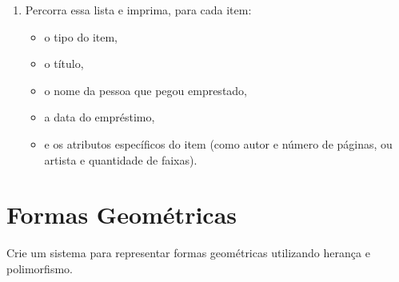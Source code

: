 \documentclass{article}
\begin{document}
\begin{enumerate}
    \item Percorra essa lista e imprima, para cada item:
    \begin{itemize}
        \item o tipo do item,
        \item o título,
        \item o nome da pessoa que pegou emprestado,
        \item a data do empréstimo,
        \item e os atributos específicos do item (como autor e número de páginas, ou artista e quantidade de faixas).
    \end{itemize}
\end{enumerate}

\section{Formas Geométricas}

Crie um sistema para representar formas geométricas utilizando herança e polimorfismo.
\end{document}
